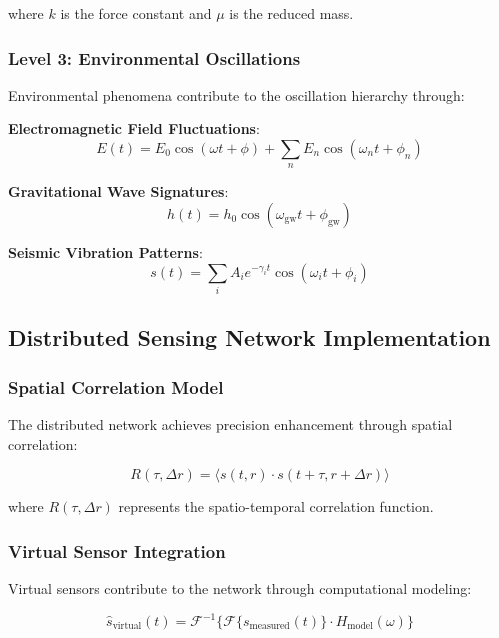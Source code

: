 \documentclass[12pt,a4paper]{article}
\begin{document}
{{{{{{{{{{{{{{where $k$ is the force constant and $\mu$ is the reduced mass.

\subsubsection{Level 3: Environmental Oscillations}

Environmental phenomena contribute to the oscillation hierarchy through:

\textbf{Electromagnetic Field Fluctuations}:
\begin{equation}
E(t) = E_0 \cos(\omega t + \phi) + \sum_{n} E_n \cos(\omega_n t + \phi_n)
\end{equation}

\textbf{Gravitational Wave Signatures}:
\begin{equation}
h(t) = h_0 \cos(\omega_{\text{gw}} t + \phi_{\text{gw}})
\end{equation}

\textbf{Seismic Vibration Patterns}:
\begin{equation}
s(t) = \sum_{i} A_i e^{-\gamma_i t} \cos(\omega_i t + \phi_i)
\end{equation}

\subsection{Distributed Sensing Network Implementation}

\subsubsection{Spatial Correlation Model}

The distributed network achieves precision enhancement through spatial correlation:

\begin{equation}
R(\tau, \Delta r) = \langle s(t, r) \cdot s(t + \tau, r + \Delta r) \rangle
\end{equation}

where $R(\tau, \Delta r)$ represents the spatio-temporal correlation function.

\subsubsection{Virtual Sensor Integration}

Virtual sensors contribute to the network through computational modeling:

\begin{equation}
\hat{s}_{\text{virtual}}(t) = \mathcal{F}^{-1}\{\mathcal{F}\{s_{\text{measured}}(t)\} \cdot H_{\text{model}}(\omega)\}
\end{equation}

}}}}}}}}}}}}}}
\end{document}
